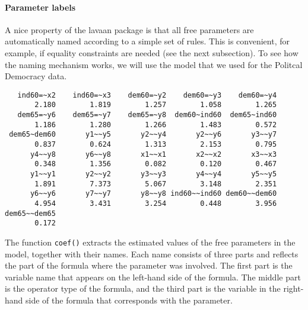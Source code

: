 \hypertarget{parameter-labels}{%
\paragraph{Parameter labels}\label{parameter-labels}}

A nice property of the lavaan package is that all free parameters are
automatically named according to a simple set of rules. This is
convenient, for example, if equality constraints are needed (see the
next subsection). To see how the naming mechanism works, we will use the
model that we used for the Politcal Democracy data.

\begin{Shaded}
\begin{Highlighting}[]
\StringTok{ }
\end{Highlighting}
\end{Shaded}

\begin{verbatim}
   ind60=~x2    ind60=~x3    dem60=~y2    dem60=~y3    dem60=~y4 
       2.180        1.819        1.257        1.058        1.265 
   dem65=~y6    dem65=~y7    dem65=~y8  dem60~ind60  dem65~ind60 
       1.186        1.280        1.266        1.483        0.572 
 dem65~dem60       y1~~y5       y2~~y4       y2~~y6       y3~~y7 
       0.837        0.624        1.313        2.153        0.795 
      y4~~y8       y6~~y8       x1~~x1       x2~~x2       x3~~x3 
       0.348        1.356        0.082        0.120        0.467 
      y1~~y1       y2~~y2       y3~~y3       y4~~y4       y5~~y5 
       1.891        7.373        5.067        3.148        2.351 
      y6~~y6       y7~~y7       y8~~y8 ind60~~ind60 dem60~~dem60 
       4.954        3.431        3.254        0.448        3.956 
dem65~~dem65 
       0.172 
\end{verbatim}

The function \texttt{coef()} extracts the estimated values of the free
parameters in the model, together with their names. Each name consists
of three parts and reflects the part of the formula where the parameter
was involved. The first part is the variable name that appears on the
left-hand side of the formula. The middle part is the operator type of
the formula, and the third part is the variable in the right-hand side
of the formula that corresponds with the parameter.

